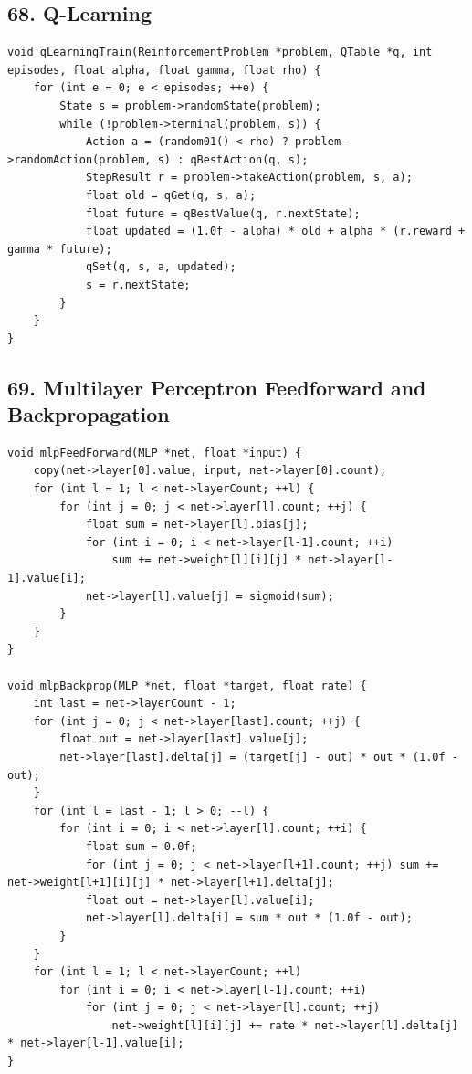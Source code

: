\documentclass[10pt,letterpaper]{article}
\begin{document}
\subsection*{68. Q-Learning}
{}

\begin{verbatim}
void qLearningTrain(ReinforcementProblem *problem, QTable *q, int episodes, float alpha, float gamma, float rho) {
    for (int e = 0; e < episodes; ++e) {
        State s = problem->randomState(problem);
        while (!problem->terminal(problem, s)) {
            Action a = (random01() < rho) ? problem->randomAction(problem, s) : qBestAction(q, s);
            StepResult r = problem->takeAction(problem, s, a);
            float old = qGet(q, s, a);
            float future = qBestValue(q, r.nextState);
            float updated = (1.0f - alpha) * old + alpha * (r.reward + gamma * future);
            qSet(q, s, a, updated);
            s = r.nextState;
        }
    }
}
\end{verbatim}

\subsection*{69. Multilayer Perceptron Feedforward and Backpropagation}
{}

\begin{verbatim}
void mlpFeedForward(MLP *net, float *input) {
    copy(net->layer[0].value, input, net->layer[0].count);
    for (int l = 1; l < net->layerCount; ++l) {
        for (int j = 0; j < net->layer[l].count; ++j) {
            float sum = net->layer[l].bias[j];
            for (int i = 0; i < net->layer[l-1].count; ++i)
                sum += net->weight[l][i][j] * net->layer[l-1].value[i];
            net->layer[l].value[j] = sigmoid(sum);
        }
    }
}

void mlpBackprop(MLP *net, float *target, float rate) {
    int last = net->layerCount - 1;
    for (int j = 0; j < net->layer[last].count; ++j) {
        float out = net->layer[last].value[j];
        net->layer[last].delta[j] = (target[j] - out) * out * (1.0f - out);
    }
    for (int l = last - 1; l > 0; --l) {
        for (int i = 0; i < net->layer[l].count; ++i) {
            float sum = 0.0f;
            for (int j = 0; j < net->layer[l+1].count; ++j) sum += net->weight[l+1][i][j] * net->layer[l+1].delta[j];
            float out = net->layer[l].value[i];
            net->layer[l].delta[i] = sum * out * (1.0f - out);
        }
    }
    for (int l = 1; l < net->layerCount; ++l)
        for (int i = 0; i < net->layer[l-1].count; ++i)
            for (int j = 0; j < net->layer[l].count; ++j)
                net->weight[l][i][j] += rate * net->layer[l].delta[j] * net->layer[l-1].value[i];
}
\end{verbatim}
\end{document}
